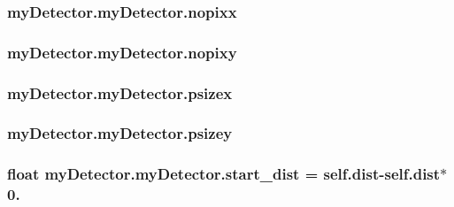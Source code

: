 \hypertarget{classmy_detector_1_1my_detector_ae7c12b4ce74cc80a85dae3843f8b764c}{
\subsubsection[{nopixx}]{\setlength{\rightskip}{0pt plus 5cm}my\-Detector.\-my\-Detector.\-nopixx}}\label{classmy_detector_1_1my_detector_ae7c12b4ce74cc80a85dae3843f8b764c}
\hypertarget{classmy_detector_1_1my_detector_a3e60d490ee58d6c5d8ccb7a7a7f24c2e}{
\subsubsection[{nopixy}]{\setlength{\rightskip}{0pt plus 5cm}my\-Detector.\-my\-Detector.\-nopixy}}\label{classmy_detector_1_1my_detector_a3e60d490ee58d6c5d8ccb7a7a7f24c2e}
\hypertarget{classmy_detector_1_1my_detector_aee1c732a56fbddef76f8b8b654d8b67a}{
\subsubsection[{psizex}]{\setlength{\rightskip}{0pt plus 5cm}my\-Detector.\-my\-Detector.\-psizex}}\label{classmy_detector_1_1my_detector_aee1c732a56fbddef76f8b8b654d8b67a}
\hypertarget{classmy_detector_1_1my_detector_ac4bb2831ee384d8f59c2ccabf72927f1}{
\subsubsection[{psizey}]{\setlength{\rightskip}{0pt plus 5cm}my\-Detector.\-my\-Detector.\-psizey}}\label{classmy_detector_1_1my_detector_ac4bb2831ee384d8f59c2ccabf72927f1}
\hypertarget{classmy_detector_1_1my_detector_a236fc1245269dda1ad8eb67c429d4ea7}{
\subsubsection[{start\-\_\-dist}]{\setlength{\rightskip}{0pt plus 5cm}float my\-Detector.\-my\-Detector.\-start\-\_\-dist = self.\-dist-\/self.\-dist$\ast$0.\hspace{0.3cm}{\ttfamily [static]}}}\label{classmy_detector_1_1my_detector_a236fc1245269dda1ad8eb67c429d4ea7}
